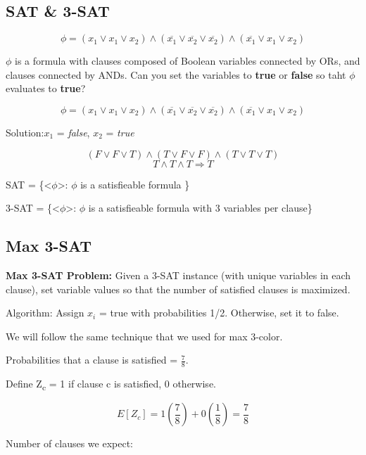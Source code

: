 \documentclass[11pt]{article}
\begin{document}
\subsection{SAT \& 3-SAT}
\label{sec:org684810f}

\[ \phi = (x_1 \vee x_1 \vee x_2) \wedge (\overline{x_1} \vee \overline{x_2} \vee \overline{x_2}) \wedge (\overline{x_1} \vee x_1 \vee x_2) \]

\(\phi\) is a formula with clauses composed of Boolean variables connected by ORs, and clauses connected by ANDs. Can you set the variables to \textbf{\textbf{true}} or \textbf{\textbf{false}} so taht \(\phi\) evaluates to \textbf{\textbf{true}}?



\[ \phi = (x_1 \vee x_1 \vee x_2) \wedge (\overline{x_1} \vee \overline{x_2} \vee
\overline{x_2}) \wedge (\overline{x_1} \vee x_1 \vee x_2) \]

Solution:\(x_1\) = \emph{false}, \(x_2\) = \emph{true}



\[ (F \vee F \vee T) \wedge (T \vee F \vee F) \wedge (T \vee T \vee T) \]
\[ T \wedge T \wedge T \Longrightarrow T \]


SAT = \{<\(\phi\)>: \(\phi\) is a satisfieable formula \}

3-SAT = \{<\(\phi\)>: \(\phi\) is a satisfieable formula with 3 variables per clause\}


\subsection{Max 3-SAT}
\label{sec:org9486542}

\textbf{\textbf{Max 3-SAT Problem:}} Given a 3-SAT instance (with unique variables in each clause), set variable values so that the number of satisfied clauses is maximized.


Algorithm: Assign \(x_i\) = true with probabilities 1/2. Otherwise, set it to false.

We will follow the same technique that we used for max 3-color.

Probabilities that a clause is satisfied = \(\frac{7}{8}\).

Define Z\textsubscript{c} = 1 if clause c is satisfied, 0 otherwise.

\[ E[Z_c] = 1 \left(\frac{7}{8} \right) + 0 \left(\frac{1}{8} \right) = \frac{7}{8} \]

\newpage

Number of clauses we expect:
\end{document}
